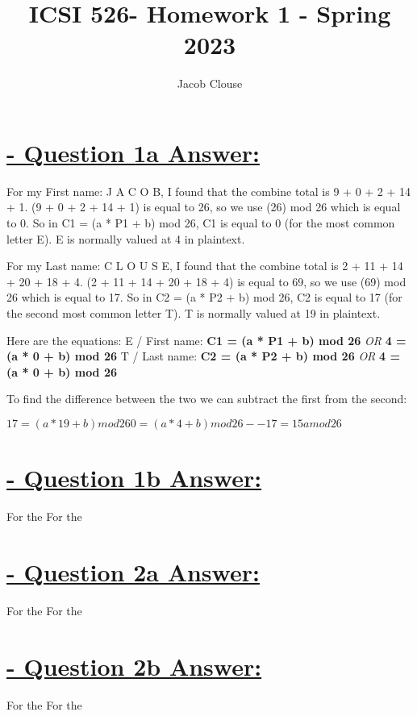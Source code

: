 \documentclass{article}
\author{Jacob Clouse}
\title{ICSI 526- Homework 1 - Spring 2023}
\begin{document}
	
\maketitle	
	
\section{\underline{ - Question 1a Answer:}}
For my First name: J A C O B, I found that the combine total is 9 + 0 + 2 + 14 + 1. (9 + 0 + 2 + 14 + 1) is equal to 26, so we use (26) mod 26 which is equal to 0. So in C1 = (a * P1 + b) mod 26, C1 is equal to 0 (for the most common letter E). E is normally valued at 4 in plaintext. \newline


For my Last name: C L O U S E, I found that the combine total is 2 + 11 + 14 + 20 + 18 + 4. (2 + 11 + 14 + 20 + 18 + 4) is equal to 69, so we use (69) mod 26 which is equal to 17. So in C2 = (a * P2 + b) mod 26, C2 is equal to 17 (for the second most common letter T). T is normally valued at 19 in plaintext. \newline

Here are the equations: \newline
E / First name: \textbf{C1 = (a * P1 + b) mod 26} \textit{OR} \textbf{4 = (a * 0 + b) mod 26} \newline
T / Last name:  \textbf{C2 = (a * P2 + b) mod 26} \textit{OR} \textbf{4 = (a * 0 + b) mod 26} \newline


To find the difference between the two we can subtract the first from the second:

\begin{math}
	17 = (a * 19 + b)  mod  26
	0 = (a *  4 + b)   mod  26
	--
	17 = 15a  mod  26	
\end{math}


\section{\underline{ - Question 1b Answer:}}
For the 
\newline
\newline
For the 
\newline

\section{\underline{ - Question 2a Answer:}}
For the 
\newline
\newline
For the 
\newline

\section{\underline{ - Question 2b Answer:}}
For the 
\newline
\newline
For the 
\newline
\end{document}
